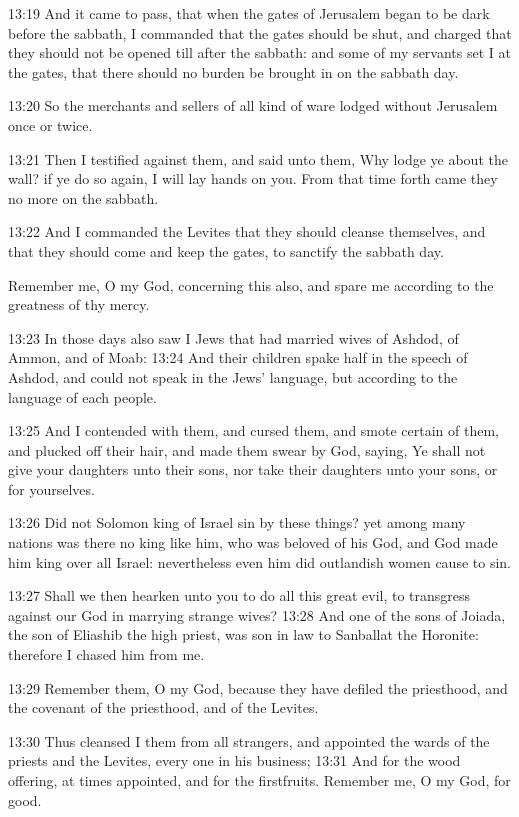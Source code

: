 13:19 And it came to pass, that when the gates of Jerusalem began to be dark before the sabbath, I commanded that the gates should be shut, and charged that they should not be opened till after the sabbath: and some of my servants set I at the gates, that there should no burden be brought in on the sabbath day.

13:20 So the merchants and sellers of all kind of ware lodged without Jerusalem once or twice.

13:21 Then I testified against them, and said unto them, Why lodge ye about the wall? if ye do so again, I will lay hands on you. From that time forth came they no more on the sabbath.

13:22 And I commanded the Levites that they should cleanse themselves, and that they should come and keep the gates, to sanctify the sabbath day.

Remember me, O my God, concerning this also, and spare me according to the greatness of thy mercy.

13:23 In those days also saw I Jews that had married wives of Ashdod, of Ammon, and of Moab: 13:24 And their children spake half in the speech of Ashdod, and could not speak in the Jews' language, but according to the language of each people.

13:25 And I contended with them, and cursed them, and smote certain of them, and plucked off their hair, and made them swear by God, saying, Ye shall not give your daughters unto their sons, nor take their daughters unto your sons, or for yourselves.

13:26 Did not Solomon king of Israel sin by these things? yet among many nations was there no king like him, who was beloved of his God, and God made him king over all Israel: nevertheless even him did outlandish women cause to sin.

13:27 Shall we then hearken unto you to do all this great evil, to transgress against our God in marrying strange wives?  13:28 And one of the sons of Joiada, the son of Eliashib the high priest, was son in law to Sanballat the Horonite: therefore I chased him from me.

13:29 Remember them, O my God, because they have defiled the priesthood, and the covenant of the priesthood, and of the Levites.

13:30 Thus cleansed I them from all strangers, and appointed the wards of the priests and the Levites, every one in his business; 13:31 And for the wood offering, at times appointed, and for the firstfruits.  Remember me, O my God, for good.

